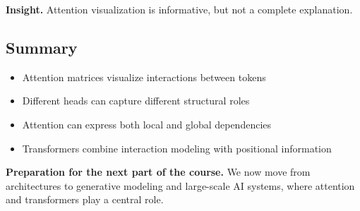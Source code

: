 \medskip

\noindent
\textbf{Insight.}  
Attention visualization is informative, but not a complete explanation.

\subsection{Summary}

\begin{itemize}
    \item Attention matrices visualize interactions between tokens
    \item Different heads can capture different structural roles
    \item Attention can express both local and global dependencies
    \item Transformers combine interaction modeling with positional information
\end{itemize}

\medskip

\noindent
\textbf{Preparation for the next part of the course.}  
We now move from architectures to generative modeling and large-scale AI systems, where attention and transformers play a central role.